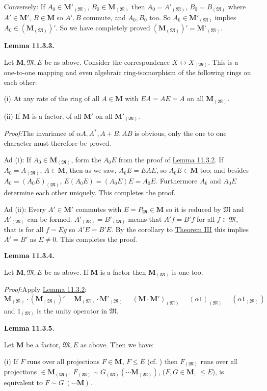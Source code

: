 \documentclass[12pt,b5paper,twoside]{article}
\newcommand{\M}{\mathbf M}
\newcommand{\Lemma}[1]{%
  \par\smallskip\noindent\phantomsection\label{lem:#1}\textbf{Lemma #1.}\enspace
}
\newcommand{\Proof}{\par\noindent\textit{Proof:}\enspace}
\newcommand{\lemref}[1]{\hyperref[lem:#1]{Lemma #1}}
\newcommand{\thmref}[1]{\hyperref[thm:#1]{Theorem #1}}
\begin{document}
Conversely: If $A_0\in\M'_{(\mathfrak M)}$,
$B_0\in\M_{(\mathfrak M)}$ then
$A_0=A'_{(\mathfrak M)}$, $B_0=B_{(\mathfrak M)}$ where
$A'\in\M'$, $B\in\M$ so $A',B$ commute, and $A_0,B_0$ too. So
$A_0\in\M'_{(\mathfrak M)}$ implies
$A_0\in(\M_{(\mathfrak M)})'$. So we have completely proved
$(\M_{(\mathfrak M)})'=\M'_{(\mathfrak M)}$.

\Lemma{11.3.3}
Let $\M,\mathfrak M,E$ be as above. Consider the correspondence
$X\longleftrightarrow X_{(\mathfrak M)}$. This is a one-to-one mapping and
even algebraic ring-isomorphism of the following rings on each other:

(i) At any rate of the ring of all $A\in\M$ with $EA=AE=A$ on all
$\M_{(\mathfrak M)}$.

(ii) If $\M$ is a factor, of all $\M'$ on all
$\M'_{(\mathfrak M)}$.

\Proof The invariance of $\alpha A,A^*,A+B,AB$ is obvious, only the one to
one character must therefore be proved.

Ad (i): If $A_0\in\M_{(\mathfrak M)}$, form the $A_0E$ from the proof of
\lemref{11.3.2}. If $A_0=A_{(\mathfrak M)}$, $A\in\M$, then as we saw,
$A_0E=EAE$, so $A_0E\in\M$ too; and besides
$A_0=(A_0E)_{(\mathfrak M)}$, $E(A_0E)=(A_0E)E=A_0E$. Furthermore $A_0$
and $A_0E$ determine each other uniquely. This completes the proof.

Ad (ii): Every $A'\in\M'$ commutes with $E=P_{\mathfrak M}\in\M$ so it
is reduced by $\mathfrak M$ and $A'_{(\mathfrak M)}$ can be formed.
$A'_{(\mathfrak M)}=B'_{(\mathfrak M)}$ means that $A'f=B'f$ for all
$f\in\mathfrak M$, that is for all $f=Eg$ so $A'E=B'E$. By the corollary
to \thmref{III} this implies $A'=B'$ as $E\ne0$. This completes the proof.

\Lemma{11.3.4}
Let $\M,\mathfrak M,E$ be as above. If $\M$ is a factor then
$\M_{(\mathfrak M)}$ is one too.

\Proof Apply \lemref{11.3.2}:
\[
 \M_{(\mathfrak M)}\cdot(\M_{(\mathfrak M)})'
 =\M_{(\mathfrak M)}\cdot\M'_{(\mathfrak M)}
 =(\M\cdot\M')_{(\mathfrak M)}
 =(\alpha1)_{(\mathfrak M)}=(\alpha1_{(\mathfrak M)})
\]
and $1_{(\mathfrak M)}$ is the unity operator in $\mathfrak M$.

\Lemma{11.3.5}
Let $\M$ be a factor, $\mathfrak M,E$ as above. Then we have:

(i) If $F$ runs over all projections $F\in\M$, $F\leq E$ (cf.
\cite[p.~76]{ref16}) then $F_{(\mathfrak M)}$ runs over all projections
$\in\M_{(\mathfrak M)}$.
$F_{(\mathfrak M)}\sim G_{(\mathfrak M)}
(\cdots\M_{(\mathfrak M)})$, ($F,G\in\M$, $\leq E$), is equivalent to
$F\sim G\ (\cdots\M)$.
\end{document}
